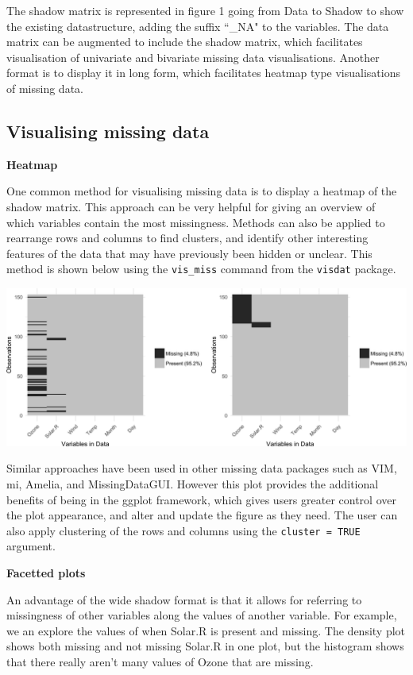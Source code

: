 \documentclass[]{article}
\begin{document}
The shadow matrix is represented in figure 1 going from Data to Shadow
to show the existing datastructure, adding the suffix ``\_NA" to the
variables. The data matrix can be augmented to include the shadow
matrix, which facilitates visualisation of univariate and bivariate
missing data visualisations. Another format is to display it in long
form, which facilitates heatmap type visualisations of missing data.

\subsection{Visualising missing data}\label{visualising-missing-data}

\textbf{Heatmap}

One common method for visualising missing data is to display a heatmap
of the shadow matrix. This approach can be very helpful for giving an
overview of which variables contain the most missingness. Methods can
also be applied to rearrange rows and columns to find clusters, and
identify other interesting features of the data that may have previously
been hidden or unclear. This method is shown below using the
\texttt{vis\_miss} command from the \texttt{visdat} package.

\includegraphics{jsm2017_files/figure-latex/unnamed-chunk-1-1.png}

Similar approaches have been used in other missing data packages such as
VIM, mi, Amelia, and MissingDataGUI. However this plot provides the
additional benefits of being in the ggplot framework, which gives users
greater control over the plot appearance, and alter and update the
figure as they need. The user can also apply clustering of the rows and
columns using the \texttt{cluster\ =\ TRUE} argument.

\textbf{Facetted plots}

An advantage of the wide shadow format is that it allows for referring
to missingness of other variables along the values of another variable.
For example, we an explore the values of when Solar.R is present and
missing. The density plot shows both missing and not missing Solar.R in
one plot, but the histogram shows that there really aren't many values
of Ozone that are missing.
\end{document}
